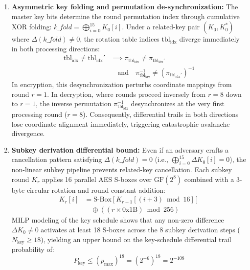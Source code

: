 \documentclass[review,12pt]{elsarticle}
\begin{document}
\begin{enumerate}
    \item \textbf{Asymmetric key folding and permutation de-synchronization:} The master key bits determine the round permutation index through cumulative XOR folding: $\mathit{k\_fold} = \bigoplus_{i=0}^{15} K_0[i]$. Under a related-key pair $(K_0, K_0^*)$ where $\Delta(\mathit{k\_fold}) \neq 0$, the rotation table indices $\text{tbl}_{\text{idx}}$ diverge immediately in both processing directions:
    \begin{equation}
    \begin{aligned}
        \text{tbl}_{\text{idx}} \neq \text{tbl}_{\text{idx}}' &\implies \pi_{\text{tbl}_{\text{idx}}} \neq \pi_{\text{tbl}_{\text{idx}}'} \\
        &\quad \text{and} \quad \pi_{\text{tbl}_{\text{idx}}}^{-1} \neq (\pi_{\text{tbl}_{\text{idx}}'})^{-1}
    \end{aligned}
    \end{equation}
    In encryption, this desynchronization perturbs coordinate mappings from round $r=1$. In decryption, where rounds proceed inversely from $r=8$ down to $r=1$, the inverse permutation $\pi_{\text{tbl}_{\text{idx}}}^{-1}$ desynchronizes at the very first processing round ($r=8$). Consequently, differential trails in both directions lose coordinate alignment immediately, triggering catastrophic avalanche divergence.
    
    \item \textbf{Subkey derivation differential bound:} Even if an adversary crafts a cancellation pattern satisfying $\Delta(\mathit{k\_fold}) = 0$ (i.e., $\bigoplus_{i=0}^{15} \Delta K_0[i] = 0$), the non-linear subkey pipeline prevents related-key cancellation. Each subkey round $K_r$ applies 16 parallel AES S-boxes over $\text{GF}(2^8)$ combined with a 3-byte circular rotation and round-constant addition:
    \begin{equation}
    \begin{aligned}
        K_r[i] &= \text{S-Box}\left[K_{r-1}[(i+3) \bmod 16]\right] \\
        &\quad \oplus \left((r \times \text{0x1B}) \bmod 256\right)
    \end{aligned}
    \end{equation}
    MILP modeling of the key schedule shows that any non-zero difference $\Delta K_0 \neq 0$ activates at least 18 S-boxes across the 8 subkey derivation steps ($N_{\text{key}} \ge 18$), yielding an upper bound on the key-schedule differential trail probability of:
    \begin{equation}
        P_{\text{key}} \le (p_{\max})^{18} = (2^{-6})^{18} = 2^{-108}
    \end{equation}
    

\end{enumerate}
\end{document}
